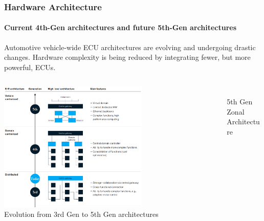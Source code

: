 \begin{frame}
\frametitle{Hardware Architecture}
\framesubtitle{Current 4th-Gen architectures and future 5th-Gen architectures}
\small{Automotive vehicle-wide ECU architectures are evolving and undergoing
drastic changes. Hardware complexity is being reduced by integrating fewer,
but more powerful, ECUs.}
\begin{columns}[]
    \begin{column}{0.6\textwidth}
        \centering
        \includegraphics[width=0.65\textwidth]{images/mckinsey_vehicle_architecture_generations.png}\\
        \tiny Evolution from 3rd Gen to 5th Gen architectures \cite{McKinseyReport}
    \end{column}
    \begin{column}{0.4\textwidth}
        \centering
        \\
        \tiny{5th Gen Zonal Architecture\footnotemark[1]}
    \end{column}
\end{columns}
\end{frame}
